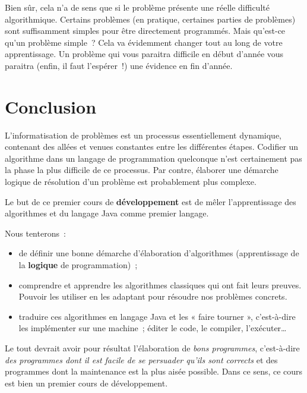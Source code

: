 		Bien sûr, cela n’a de sens que si le problème présente
		une réelle difficulté algorithmique. 
		Certains problèmes (en pratique, certaines parties de problèmes) 
		sont suffisamment simples pour être directement programmés. 
		Mais qu’est-ce qu’un problème simple~? 
		Cela va évidemment changer tout au long de votre apprentissage. 
		Un problème qui vous paraitra difficile en début d’année 
		vous paraitra (enfin, il faut l’espérer~!) 
		une évidence en fin d’année.
	
	\section{Conclusion}
	
		L’informatisation de problèmes 
		est un processus essentiellement dynamique, 
		contenant des allées et venues constantes 
		entre les différentes étapes. 
		Codifier un algorithme dans un langage de programmation quelconque 
		n’est certainement pas la phase la plus difficile de ce processus. 
		Par contre, élaborer une démarche logique de résolution 
		d’un problème est probablement plus complexe.
		
		Le but de ce premier cours de \textbf{développement} est de mêler 
		l'apprentissage des algorithmes et du langage Java comme premier 
		langage. 
		
		Nous tenterons~:
	
		\begin{itemize}

		\item
			de définir une bonne démarche d’élaboration d’algorithmes
			(apprentissage de la \textbf{logique} de programmation)~;
		\item
			comprendre et apprendre les algorithmes classiques 
			qui ont fait leurs preuves.
			Pouvoir les utiliser en les adaptant 
			pour résoudre nos problèmes concrets.
		\item
			traduire ces algorithmes en langage Java et les « faire tourner »,
			c'est-à-dire les implémenter sur une machine~; éditer le code, le
			compiler, l'exécuter…
		
		\end{itemize}
	
		Le tout devrait avoir pour résultat l’élaboration 
		de \textit{bons programmes}, 
		c’est-à-dire \textit{des programmes dont il est facile de
		se persuader qu’ils sont corrects} et des programmes dont la
		maintenance est la plus aisée possible. 
		Dans ce sens, ce cours est bien un premier cours de développement.
		
